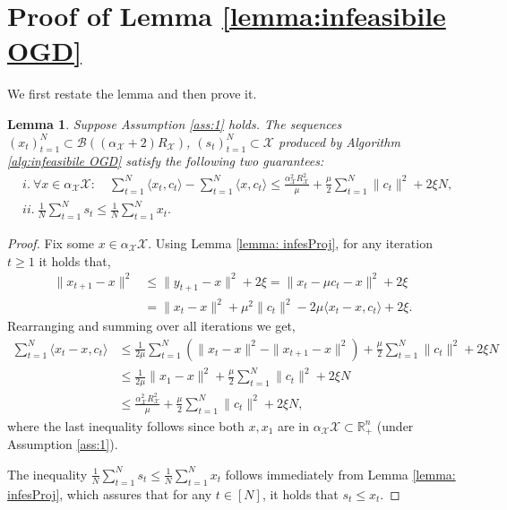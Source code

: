 \documentclass[a4paper,12pt]{article}
\newtheorem{lemma} {Lemma}
\newcommand{\mX}{\mathcal{X}}
\newcommand{\mB}{\mathcal{B}}
\newcommand{\reals}{\mathbb{R}}
\begin{document}
\section{Proof of Lemma \ref{lemma:infeasibile OGD}}
We first restate the lemma and then prove it.
\begin{lemma}
Suppose Assumption \ref{ass:1} holds. The sequences $(x_t)_{t=1}^N\subset\mB((\alpha_{\mX}+2)R_{\mX})$, $(s_t)_{t=1}^N\subset\mX$ produced by Algorithm \ref{alg:infeasibile OGD} satisfy the following two guarantees:
\begin{align*}
&i.~ \forall x \in \alpha_\mX \mX: \quad \sum_{t=1}^N \langle x_t,c_t \rangle -\sum_{t=1}^N \langle x,c_t \rangle \leq  \frac{\alpha_{\mX}^2R_{\mX}^2}{\mu }  +\frac{\mu }{2} \sum_{t=1}^N \|c_t\|^2 + 2\xi N, \\
&ii.~  \frac{1}{N}\sum_{t=1}^Ns_t \leq \frac{1}{N}\sum_{t=1}^N x_t.
\end{align*}
\end{lemma}
\begin{proof}
Fix some $x \in \alpha_\mX \mX$. Using Lemma \ref{lemma: infesProj}, for any iteration $t \geq 1$ it holds that,
\begin{align*}
\|x_{t+1} -x \|^2 &\leq  \|y_{t+1} -x \|^2 +2\xi = \|x_t -\mu c_t -x \|^2 +2\xi \\
&=  \|x_t -x \|^2 + \mu^2 \|c_t \|^2 - 2\mu\langle{x_t -x, c_t}\rangle +2\xi.
\end{align*}
Rearranging and summing over all iterations we get,
\begin{align*}
\sum_{t=1}^N \langle{x_t - x, c_t}\rangle &\leq \frac{1}{2 \mu} \sum_{t=1}^N\left( \|x_t-x\|^2 - \|x_{t+1}-x\|^2 \right) + \frac{\mu}{2} \sum_{t=1}^N \|c_t\|^2 + 2\xi{}N \\
&\leq \frac{1}{2 \mu } \|x_1-x\|^2 +\frac{\mu }{2} \sum_{t=1}^N \|c_t\|^2 + 2\xi{}N\\
&\leq \frac{\alpha_{\mX}^2 R_{\mX}^2}{ \mu } +\frac{\mu }{2} \sum_{t=1}^N \|c_t\|^2 + 2\xi  N,
\end{align*}
where the last inequality follows since both $x,x_1$ are in $\alpha_{\mX}\mX\subset\reals^n_+$ (under Assumption \ref{ass:1}).

The inequality $\frac{1}{N}\sum_{t=1}^N s_t \leq \frac{1}{N}\sum_{t=1}^N x_t$ follows immediately from Lemma \ref{lemma: infesProj}, which assures that for any $t\in[N]$, it holds that  $s_t \leq x_t$.
\end{proof}
\end{document}
